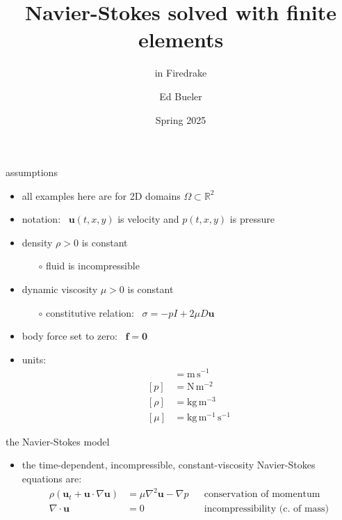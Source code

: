 \documentclass[10pt,hyperref,colorlinks]{beamer}
\title{Navier-Stokes solved with finite elements}
\subtitle{in Firedrake}
\author{Ed Bueler}
\institute{MATH 692 Fluids \& Solids Seminar}
\date{Spring 2025}
\newcommand{\bbf}{\mathbf{f}}
\newcommand{\bu}{\mathbf{u}}
\newcommand{\bzero}{\bm{0}}
\newcommand{\grad}{\nabla}
\newcommand{\Div}{\nabla\cdot}
\newcommand{\RR}{\mathbb{R}}
\begin{document}
\beamertemplatenavigationsymbolsempty

\begin{frame}
  \maketitle
\end{frame}


\begin{frame}{assumptions}

\begin{itemize}
\item all examples here are for 2D domains $\Omega \subset \RR^2$
\item notation: \, $\bu(t,x,y)$ is velocity and $p(t,x,y)$ is pressure
\item density $\rho>0$ is constant
    \begin{itemize}
    \item[$\circ$] fluid is incompressible
    \end{itemize}
\item dynamic viscosity $\mu>0$ is constant
    \begin{itemize}
    \item[$\circ$] constitutive relation: \, $\sigma = -p I + 2 \mu D\bu$
    \end{itemize}
\item body force set to zero: \, $\bbf = \bzero$

\bigskip
\item units:
\begin{align*}
    [\bu]&=\text{m}\,\text{s}^{-1} \\
    [p]&=\text{N}\,\text{m}^{-2} \\
    [\rho]&=\text{kg}\,\text{m}^{-3} \\
    [\mu]&=\text{kg}\,\text{m}^{-1}\,\text{s}^{-1}
\end{align*}
\end{itemize}
\end{frame}


\begin{frame}{the Navier-Stokes model}

\begin{itemize}
\item the time-dependent, incompressible, constant-viscosity Navier-Stokes equations are:
\begin{align*}
\rho\left(\bu_t + \bu \cdot \grad \bu\right) &= \mu \grad^2 \bu - \grad p & &\text{conservation of momentum} \\
\Div \bu &= 0 & &\text{incompressibility (c.~of mass)}
\end{align*}
\end{itemize}
\end{frame}
\end{document}
